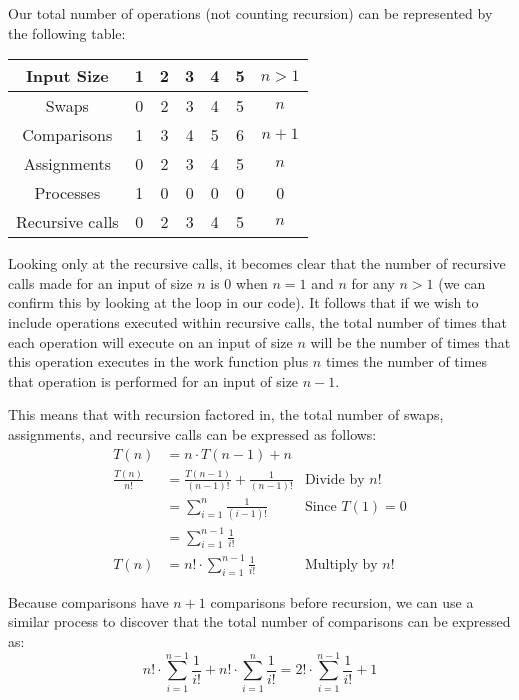 \documentclass[10pt, oneside]{article}   	%
\begin{document}
Our total number of operations (not counting recursion) can be represented by the following table:

\begin{center}
\begin{tabular}{|c|c|c|c|c|c|c|}
	\hline
	Input Size & 1 & 2 & 3 & 4 & 5 & $n > 1$\\
	\hline
	Swaps & 0 & 2 & 3 & 4 & 5 & $n$\\
	\hline
	Comparisons & 1 & 3 & 4 & 5 & 6 & $n + 1$ \\
	\hline
	Assignments & 0 & 2 & 3 & 4 & 5 & $n$ \\
	\hline
	Processes & 1 & 0 & 0 & 0 & 0 & 0 \\
	\hline
	Recursive calls & 0 & 2 & 3 & 4 & 5 & $n$ \\
	\hline
\end{tabular}
\end{center}

Looking only at the recursive calls, it becomes clear that the number of recursive calls made for an input of size $n$ is 0 when $n = 1$ and $n$ for any $n > 1$ (we can confirm this by looking at the loop in our code). It follows that if we wish to include operations executed within recursive calls, the total number of times that each operation will execute on an input of size $n$ will be the number of times that this operation executes in the work function plus $n$ times the number of times that operation is performed for an input of size $n - 1$.

This means that with recursion factored in, the total number of swaps, assignments, and recursive calls can be expressed as follows:
\begin{align*}
	T(n) &= n \cdot T(n - 1) + n \\
	\frac{T(n)}{n!} &= \frac{T(n - 1)}{(n - 1)!} + \frac{1}{(n - 1)!} &\text{Divide by $n!$} \\
	&= \sum_{i = 1}^{n} \frac{1}{(i - 1)!} &\text{Since $T(1) = 0$} \\
	&= \sum_{i = 1}^{n - 1} \frac{1}{i!} \\
	T(n) &= n! \cdot \sum_{i = 1}^{n - 1} \frac{1}{i!} &\text{Multiply by $n!$}
\end{align*}

Because comparisons have $n + 1$ comparisons before recursion, we can use a similar process to discover that the total number of comparisons can be expressed as:
\[
	n! \cdot \sum_{i = 1}^{n - 1} \frac{1}{i!} + n! \cdot \sum_{i = 1}^{n} \frac{1}{i!} = 2! \cdot \sum_{i = 1}^{n - 1} \frac{1}{i!} + 1
\]
\end{document}
